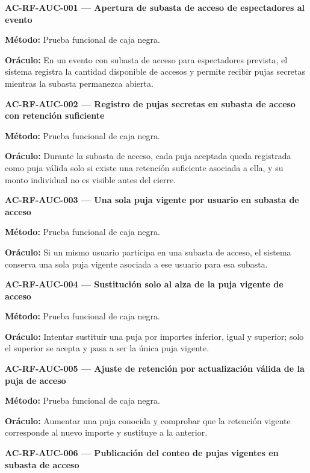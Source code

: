 \documentclass[10pt,letterpaper]{article}
\begin{document}
\noindent\textbf{AC-RF-AUC-001 --- Apertura de subasta de acceso de espectadores al evento}\par
\textbf{Método:} Prueba funcional de caja negra.\par
\textbf{Oráculo:} En un evento con subasta de acceso para espectadores prevista, el sistema registra la cantidad disponible de accesos y permite recibir pujas secretas mientras la subasta permanezca abierta.\par\vspace{0.45em}
\noindent\textbf{AC-RF-AUC-002 --- Registro de pujas secretas en subasta de acceso con retención suficiente}\par
\textbf{Método:} Prueba funcional de caja negra.\par
\textbf{Oráculo:} Durante la subasta de acceso, cada puja aceptada queda registrada como puja válida solo si existe una retención suficiente asociada a ella, y su monto individual no es visible antes del cierre.\par\vspace{0.45em}
\noindent\textbf{AC-RF-AUC-003 --- Una sola puja vigente por usuario en subasta de acceso}\par
\textbf{Método:} Prueba funcional de caja negra.\par
\textbf{Oráculo:} Si un mismo usuario participa en una subasta de acceso, el sistema conserva una sola puja vigente asociada a ese usuario para esa subasta.\par\vspace{0.45em}
\noindent\textbf{AC-RF-AUC-004 --- Sustitución solo al alza de la puja vigente de acceso}\par
\textbf{Método:} Prueba funcional de caja negra.\par
\textbf{Oráculo:} Intentar sustituir una puja por importes inferior, igual y superior; solo el superior se acepta y pasa a ser la única puja vigente.\par\vspace{0.45em}
\noindent\textbf{AC-RF-AUC-005 --- Ajuste de retención por actualización válida de la puja de acceso}\par
\textbf{Método:} Prueba funcional de caja negra.\par
\textbf{Oráculo:} Aumentar una puja conocida y comprobar que la retención vigente corresponde al nuevo importe y sustituye a la anterior.\par\vspace{0.45em}
\noindent\textbf{AC-RF-AUC-006 --- Publicación del conteo de pujas vigentes en subasta de acceso}\par
\end{document}
